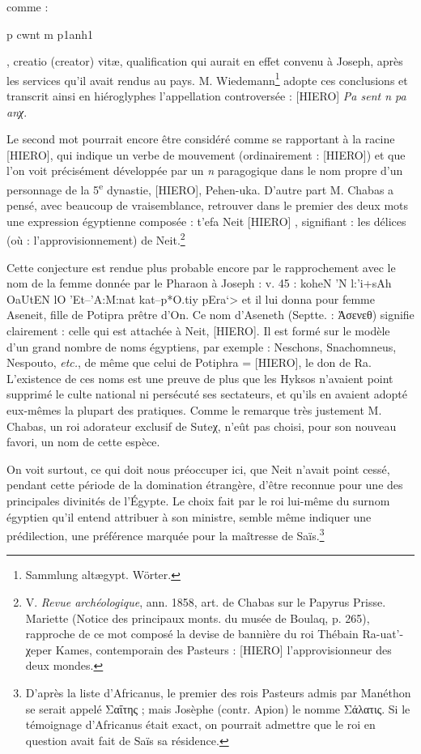 \documentclass[a4paper, 11pt, oneside]{article}
\begin{document}
comme : \begin{coptic}p cwnt m p1anh1\end{coptic}, creatio (creator) vitæ, qualification qui aurait en effet convenu à Joseph, après les services qu'il avait rendus au pays. M. Wiedemann\footnote{Sammlung altægypt. Wörter.} adopte ces conclusions et transcrit ainsi en hiéroglyphes l'appellation controversée : [HIERO] \emph{Pa sent n pa anχ}.

Le second mot pourrait encore être considéré comme se rapportant à la racine [HIERO], qui indique un verbe de mouvement (ordinairement : [HIERO]) et que l'on voit précisément développée par un \emph{n} paragogique dans le nom propre d'un personnage de la 5\textsuperscript{e} dynastie, [HIERO], Pehen-uka. D'autre part M. Chabas a pensé, avec beaucoup de vraisemblance, retrouver dans le premier des deux mots une expression égyptienne composée : t'efa Neit [HIERO] , signifiant : les délices (où : l'approvisionnement) de Neit.\footnote{V. \emph{Revue archéologique}, ann. 1858, art. de Chabas sur le Papyrus Prisse. Mariette (Notice des principaux monts. du musée de Boulaq, p. 265), rapproche de ce mot composé la devise de bannière du roi Thébain Ra-uat'-χeper Kames, contemporain des Pasteurs : [HIERO] l'approvisionneur des deux mondes.}

Cette conjecture est rendue plus probable encore par le rapprochement avec le nom de la femme donnée par le Pharaon à Joseph : v. 45 : \foreignlanguage{hebrew}{\<koheN 'N l:'i+sAh OaUtEN lO 'Et--'A:M:nat kat--p*O.tiy pEra`>} et il lui donna pour femme Aseneit, fille de Potipra prêtre d'On. Ce nom d'Aseneth (Septte. : Ἀσενεθ) signifie clairement : celle qui est attachée à Neit, [HIERO]. Il est formé sur le modèle d'un grand nombre de noms égyptiens, par exemple : Neschons, Snachomneus, Nespouto, \emph{etc.}, de même que celui de Potiphra = [HIERO], le don de Ra. L'existence de ces noms est une preuve de plus que les Hyksos n'avaient point supprimé le culte national ni persécuté ses sectateurs, et qu'ils en avaient adopté eux-mêmes la plupart des pratiques. Comme le remarque très justement M. Chabas, un roi adorateur exclusif de Suteχ, n'eût pas choisi, pour son nouveau favori, un nom de cette espèce.

On voit surtout, ce qui doit nous préoccuper ici, que Neit n'avait point cessé, pendant cette période de la domination étrangère, d'être reconnue pour une des principales divinités de l'Égypte. Le choix fait par le roi lui-même du surnom égyptien qu'il entend attribuer à son ministre, semble même indiquer une prédilection, une préférence marquée pour la maîtresse de Saïs.\footnote{D'après la liste d'Africanus, le premier des rois Pasteurs admis par Manéthon se serait appelé Σαΐτης ; mais Josèphe (contr. Apion) le nomme Σάλατις. Si le témoignage d'Africanus était exact, on pourrait admettre que le roi en question avait fait de Saïs sa résidence.}
\end{document}
